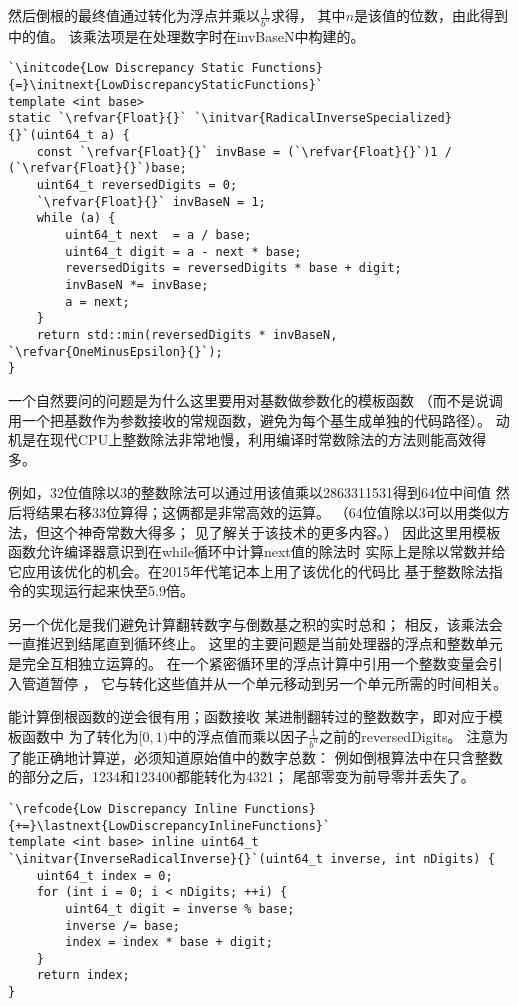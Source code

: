 然后倒根的最终值通过转化为浮点并乘以$\displaystyle\frac{1}{b^n}$求得，
其中$n$是该值的位数，由此得到中的值。
该乘法项是在处理数字时在{\ttfamily invBaseN}中构建的。
\begin{lstlisting}
`\initcode{Low Discrepancy Static Functions}{=}\initnext{LowDiscrepancyStaticFunctions}`
template <int base>
static `\refvar{Float}{}` `\initvar{RadicalInverseSpecialized}{}`(uint64_t a) {
    const `\refvar{Float}{}` invBase = (`\refvar{Float}{}`)1 / (`\refvar{Float}{}`)base;
    uint64_t reversedDigits = 0;
    `\refvar{Float}{}` invBaseN = 1;
    while (a) {
        uint64_t next  = a / base;
        uint64_t digit = a - next * base;
        reversedDigits = reversedDigits * base + digit;
        invBaseN *= invBase;
        a = next;
    }
    return std::min(reversedDigits * invBaseN, `\refvar{OneMinusEpsilon}{}`);
}
\end{lstlisting}

一个自然要问的问题是为什么这里要用对基数做参数化的模板函数
（而不是说调用一个把基数作为参数接收的常规函数，避免为每个基生成单独的代码路径）。
动机是在现代CPU上整数除法非常地慢，利用编译时常数除法的方法则能高效得多。

例如，32位值除以3的整数除法可以通过用该值乘以2863311531得到64位中间值
然后将结果右移33位算得；这俩都是非常高效的运算。
（64位值除以3可以用类似方法，但这个神奇常数大得多；
见\citet{10.5555/2462741}了解关于该技术的更多内容。）
因此这里用模板函数允许编译器意识到在{\ttfamily while}循环中计算{\ttfamily next}值的除法时
实际上是除以常数并给它应用该优化的机会。在2015年代笔记本上用了该优化的代码比
基于整数除法指令的实现运行起来快至5.9倍。

另一个优化是我们避免计算翻转数字与倒数基之积的实时总和；
相反，该乘法会一直推迟到结尾直到循环终止。
这里的主要问题是当前处理器的浮点和整数单元是完全互相独立运算的。
在一个紧密循环里的浮点计算中引用一个整数变量会引入管道暂停
，
它与转化这些值并从一个单元移动到另一个单元所需的时间相关。

能计算倒根函数的逆会很有用；函数接收
某进制翻转过的整数数字，即对应于模板函数中
为了转化为$[0,1)$中的浮点值而乘以因子$\displaystyle\frac{1}{b^n}$之前的{\ttfamily reversedDigits}。
注意为了能正确地计算逆，必须知道原始值中的数字总数：
例如倒根算法中在只含整数的部分之后，1234和123400都能转化为4321；
尾部零变为前导零并丢失了。
\begin{lstlisting}
`\refcode{Low Discrepancy Inline Functions}{+=}\lastnext{LowDiscrepancyInlineFunctions}`
template <int base> inline uint64_t
`\initvar{InverseRadicalInverse}{}`(uint64_t inverse, int nDigits) {
    uint64_t index = 0;
    for (int i = 0; i < nDigits; ++i) {
        uint64_t digit = inverse % base;
        inverse /= base;
        index = index * base + digit;
    }
    return index;
}
\end{lstlisting}

